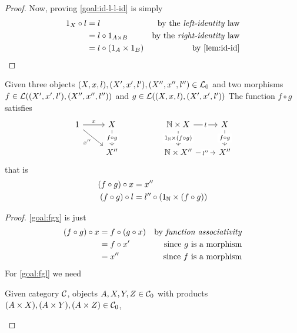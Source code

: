 \begin{solution}
\begin{proof}
			Now, proving \eqref{goal:id-l-l-id} is simply
			\begin{align*}
				1_X \circ l & = l                        & \text{by the \textit{left-identity} law}  \\
				            & = l \circ 1_{A \times B}   & \text{by the \textit{right-identity} law} \\
				            & = l \circ (1_A \times 1_B) & \text{by \cref{lem:id-id}}
			\end{align*}
		\end{proof}
		\begin{thm}
			Given three objects $(X,x,l), (X',x',l'), (X'', x'', l'') \in \mathcal{L}_0$ and two morphisms $f \in \mathcal{L}((X', x', l'), (X'', x'', l''))$ and $g \in \mathcal{L}((X, x, l), (X', x', l'))$
			The function $f \circ g$ satisfies
			\[
				\begin{tikzcd}
          1 & X && {\NN \times X} & X \\
            & X'' && {\NN \times X''} & X''
					\arrow["x", from=1-1, to=1-2]
					\arrow["x''"', from=1-1, to=2-2]
					\arrow["{f \circ g}"{description}, from=1-2, to=2-2]
					\arrow["l"{description}, from=1-4, to=1-5]
					\arrow["l''"{description}, from=2-4, to=2-5]
					\arrow["{f \circ g}"{description}, from=1-5, to=2-5]
					\arrow["{1_\NN \times (f \circ g)}"{description}, from=1-4, to=2-4]
				\end{tikzcd}
			\]
			that is
			\begin{align}
				(f \circ g) \circ x & = x'' \label{goal:fgx}                                         \\
				(f \circ g) \circ l & = l'' \circ (1_{\mathbb{N}} \times (f \circ g)) \label{goal:fgl}
			\end{align}
		\end{thm}
		\begin{proof}
			\eqref{goal:fgx} is just
			\begin{align*}
				(f \circ g) \circ x & = f \circ (g \circ x) & \text{by \textit{function associativity}} \\
				                    & = f \circ x'          & \text{since $g$ is a morphism}            \\
				                    & = x''                 & \text{since $f$ is a morphism}
			\end{align*}
			For \eqref{goal:fgl} we need
			\begin{lemma}
				\label{lem:id-fg}
				Given category $\mathcal{C}$,
				objects $A,X,Y,Z \in \mathcal{C}_0$
				with products $(A \times X), (A \times Y), (A \times Z) \in \mathcal{C}_0$,

\end{lemma}
\end{proof}
\end{solution}
